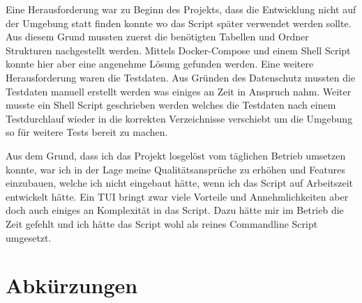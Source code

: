 \documentclass[a4paper,oneside, 12pt]{report}
\begin{document}
Eine Herausforderung war zu Beginn des Projekts, dass die Entwicklung nicht auf der Umgebung statt finden konnte wo das Script später verwendet werden sollte. Aus diesem Grund mussten zuerst die benötigten Tabellen und Ordner Strukturen nachgestellt werden. Mittels Docker-Compose und einem Shell Script konnte hier aber eine angenehme Lösung gefunden werden. Eine weitere Herausforderung waren die Testdaten. Aus Gründen des Datenschutz mussten die Testdaten manuell erstellt werden was einiges an Zeit in Anspruch nahm. Weiter musste ein Shell Script geschrieben werden welches die Testdaten nach einem Testdurchlauf wieder in die korrekten Verzeichnisse verschiebt um die Umgebung so für weitere Tests bereit zu machen.

Aus dem Grund, dass ich das Projekt losgelöst vom täglichen Betrieb umsetzen konnte, war ich in der Lage meine Qualitätsansprüche zu erhöhen und Features einzubauen, welche ich nicht eingebaut hätte, wenn ich das Script auf Arbeitszeit entwickelt hätte. Ein \ac{TUI} bringt zwar viele Vorteile und Annehmlichkeiten aber doch auch einiges an Komplexität in das Script. Dazu hätte mir im Betrieb die Zeit gefehlt und ich hätte das Script wohl als reines Commandline Script umgesetzt.


\cleardoublepage
{}
{}
\chapter*{Abkürzungen}
\begin{acronym}[Abkürzungen]
\end{acronym}
\end{document}
